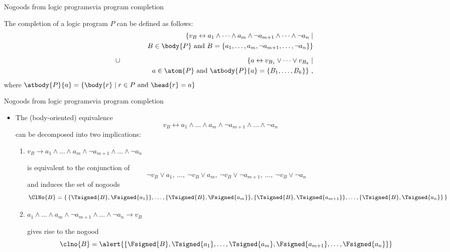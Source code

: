 \begin{frame}{Nogoods from logic programs}{via program completion}

The completion of a logic program $P$ can be defined as follows:
%
\begin{eqnarray*}
  &&
  \{
  v_B \leftrightarrow
  a_1          \wedge \dots \wedge a_m      \wedge
  \neg a_{m+1} \wedge \dots \wedge \neg a_n \mid
  \\&&\qquad\quad
  B \in\body{P} \text{ and }
  B = \{a_1,\dots,a_m,\neg a_{m+1},\dots,\neg a_n\}
  \}
  \\[6pt]
  &\cup&
  \{
  a \leftrightarrow
  v_{B_1} \vee \dots \vee v_{B_k}
  \mid
  \\&&\qquad\quad
  a\in\atom{P} \text{ and }
  \atbody{P}{a} = \{B_1,\dots,B_k\}
  \}\ ,
\end{eqnarray*}
%
where $\atbody{P}{a}=\{\body{r}\mid r\in P\text{ and }\head{r}=a\}$
\end{frame}
\begin{frame}{Nogoods from logic programs}{via program completion}

  \begin{itemize}
  \item<1-> The (body-oriented) equivalence
    \[
    v_B \leftrightarrow
         a_1     \wedge\dots\wedge      a_m \wedge
    \neg a_{m+1} \wedge\dots\wedge \neg a_n
    \]
    can be decomposed into two implications:
    \medskip
    \begin{enumerate}
    \item<only@2>\normalsize
      \alert{%
      \(
      v_B \to
           a_1     \wedge\dots\wedge      a_m \wedge
      \neg a_{m+1} \wedge\dots\wedge \neg a_n
      \)}

      \smallskip
      is equivalent to the conjunction of
      \[
      \neg v_B \vee  a_1
      ,\ \dots,\
      \neg v_B \vee  a_m
      ,\
      \neg v_B \vee  \neg a_{m+1}
      ,\ \dots,\
      \neg v_B \vee  \neg a_n
      \]
      and induces the set of nogoods
      \alert{\small%
        \[
        \ClNo{B}
        =
        \{\,\{\Tsigned{B},\Fsigned{a_1}\},
        \dots,
        \{\Tsigned{B},\Fsigned{a_m}\},
        \{\Tsigned{B},\Tsigned{a_{m+1}}\},
        \dots,
        \{\Tsigned{B},\Tsigned{a_n}\}\,\}
        \]
      }
    \item<only@3->\normalsize
      \alert{%
      \(
      a_1          \wedge \dots \wedge a_m      \wedge
      \neg a_{m+1} \wedge \dots \wedge \neg a_n
      \rightarrow v_B
      \)}

      \smallskip
      gives rise to the nogood
      \[
      \clno{B}
      =
      \alert{\{\Fsigned{B},\Tsigned{a_1},\dots,\Tsigned{a_m},\Fsigned{a_{m+1}},\dots,\Fsigned{a_n}\}}
      \]
      \bigskip
  \end{enumerate}
\end{itemize}
\end{frame}
